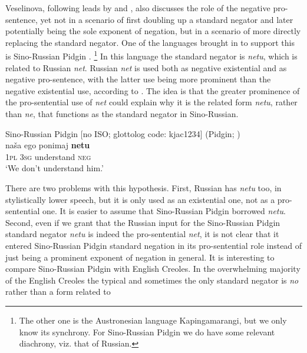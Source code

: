 ﻿\documentclass[output=paper,draft,draftmode,colorlinks,citecolor=brown]{langscibook}
\begin{document}
Veselinova, following leads by \textcite[21]{Croft1991} and
\textcite[38--39]{Schwegler1988}, also discusses the role of the negative
pro-sentence, yet not in a scenario of first doubling up a standard negator
and later potentially being the sole exponent of negation, but in a
scenario of more directly replacing the standard negator. One of the
languages brought in to support this is Sino-Russian Pidgin
\parencites[1337]{Veselinova2014}[155--156]{Veselinova2016}.%
%
    \footnote{The other one is the Austronesian language Kapingamarangi,
    but we only know its synchrony. For Sino-Russian Pidgin we do have some
    relevant diachrony, viz.  that of Russian.}  %
%
In this language the standard negator is \textit{netu},
which is related to Russian \textit{net}. Russian \textit{net} is used both
as negative existential and as negative pro-sentence, with the latter use
being more prominent than the negative existential use, according to
\textcite[1337]{Veselinova2014}. The idea is that the greater prominence
of the pro-sentential use of \textit{net} could explain why it is the
related form \textit{netu}, rather than \textit{ne}, that functions as the
standard negator in Sino-Russian.
%
\begin{exe}\ex\label{ex:int-sinorussian-understand}
Sino-Russian Pidgin [no ISO; glottolog code: kjac1234] (Pidgin;
\cites[1337]{Veselinova2014}[19]{Stern2002})\\
    \gll naša    ego  ponimaj  \textbf{netu} \\
\textsc{1pl}    \textsc{3sg}  understand  \textsc{neg} \\
    \glt `We don't understand him.'
    \end{exe}
%
There are two problems with this hypothesis. First, Russian has
\textit{netu} too, in stylistically lower speech, but it is only used as
an existential one, not as a pro-sentential one. It is easier to assume
that Sino-Russian Pidgin borrowed \textit{netu}. Second, even if we grant
that the Russian input for the Sino-Russian Pidgin standard negator
\textit{netu} is indeed the pro-sentential \textit{net}, it is not clear
that it entered Sino-Russian Pidgin standard negation in its pro-sentential
role instead of just being a prominent exponent of negation in general. It
is interesting to compare Sino-Russian Pidgin with
English Creoles. In the
overwhelming majority of the English Creoles the typical and sometimes the
only standard negator is \textit{no} rather than a form related to
\end{document}
